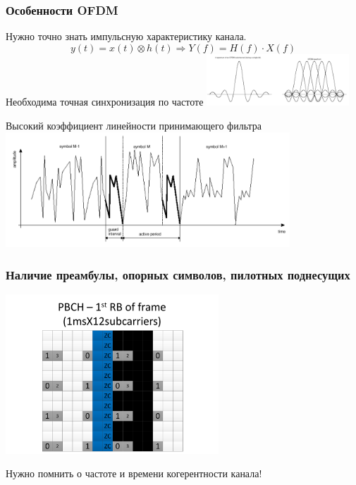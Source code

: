 \documentclass[utf8]{beamer}
\begin{document}
\begin{frame}
\frametitle{Особенности OFDM}

Нужно точно знать импульсную характеристику канала.
$$
 y(t) = x(t)\otimes h(t) \Rightarrow Y(f) = H(f)\cdot X(f)
$$
Необходима точная синхронизация по частоте
\includegraphics[width=0.4\textwidth]{pic/ofdm-spectrum.pdf}

Высокий коэффициент линейности принимающего фильтра
\includegraphics[width=0.8\textwidth]{pic/ofdm-linearity.pdf}
\end{frame}
\begin{frame}
\frametitle{Наличие преамбулы, опорных символов, пилотных поднесущих}
\begin{center}
\includegraphics[width=0.6\textwidth]{pic/lte-DL.pdf}
\end{center}
Нужно помнить о частоте и времени когерентности канала!
\end{frame}
\end{document}
